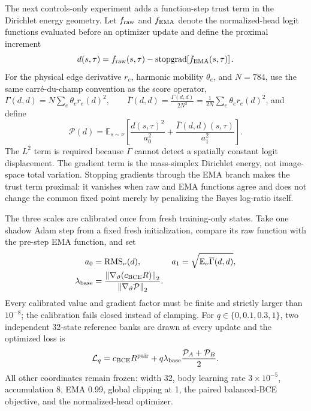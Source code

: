 \documentclass[11pt]{article}
\numberwithin{equation}{section}
\newcommand{\E}{\mathbb E}
\newcommand{\1}{\mathbf 1}
\begin{document}
The next controls-only experiment adds a function-step trust term in the
Dirichlet energy geometry.  Let \(f_{\rm raw}\) and \(f_{\rm EMA}\) denote
the normalized-head logit functions evaluated before an optimizer update and
define the proximal increment
\begin{equation}
  d(s,\tau)
  =f_{\rm raw}(s,\tau)
   -\operatorname{stopgrad}\!\left[f_{\rm EMA}(s,\tau)\right].
  \label{eq:density-ratio-h1-ema-increment}
\end{equation}
For the physical edge derivative \(r_e\), harmonic mobility \(\theta_e\),
and \(N=784\), use the same carré-du-champ convention as the score operator,
\(
  \Gamma(d,d)=N\sum_e\theta_e r_e(d)^2,
  \qquad
  \overline\Gamma(d,d)=\frac{\Gamma(d,d)}{2N^2}
    =\frac{1}{2N}\sum_e\theta_e r_e(d)^2
\), and define
\begin{equation}
  \mathcal P(d)
  =\E_{s\sim\nu}\!\left[
       \frac{d(s,\tau)^2}{a_0^2}
       +\frac{\overline\Gamma(d,d)(s,\tau)}{a_1^2}
    \right].
  \label{eq:density-ratio-h1-ema-penalty}
\end{equation}
The \(L^2\) term is required because \(\Gamma\) cannot detect a spatially
constant logit displacement.  The gradient term is the mass-simplex
Dirichlet energy, not image-space total variation.  Stopping gradients
through the EMA branch makes the trust term proximal: it vanishes when raw
and EMA functions agree and does not change the common fixed point merely by
penalizing the Bayes log-ratio itself.

The three scales are calibrated once from fresh training-only states.  Take
one shadow Adam step from a fixed fresh initialization, compare its raw
function with the pre-step EMA function, and set
\begin{align}
  a_0&=\operatorname{RMS}_{\nu}(d),
  &a_1&=\sqrt{\E_{\nu}\overline\Gamma(d,d)},
  \label{eq:density-ratio-h1-scales}\\
  \lambda_{\rm base}
  &=\frac{\left\|\nabla_\vartheta(c_{\rm BCE}R)\right\|_2}
          {\left\|\nabla_\vartheta\mathcal P\right\|_2}.
  \label{eq:density-ratio-h1-lambda}
\end{align}
Every calibrated value and gradient factor must be finite and strictly
larger than \(10^{-8}\); the calibration fails closed instead of clamping.
For \(q\in\{0,0.1,0.3,1\}\), two independent 32-state reference banks are
drawn at every update and the optimized loss is
\begin{equation}
  \mathcal L_q
  =c_{\rm BCE}R^{\rm pair}
   +q\lambda_{\rm base}\frac{\mathcal P_A+\mathcal P_B}{2}.
  \label{eq:density-ratio-h1-training-loss}
\end{equation}
All other coordinates remain frozen: width 32, body learning rate
\(3\mathbin{\times}10^{-5}\), accumulation 8, EMA 0.99, global clipping at
1, the paired balanced-BCE objective, and the normalized-head optimizer.
\end{document}
